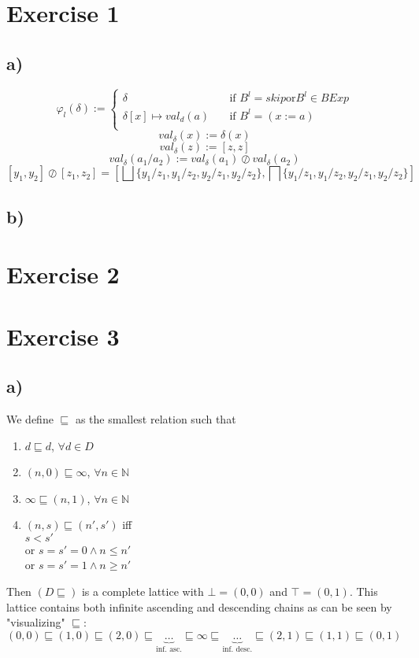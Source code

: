 \documentclass[fleqn,12pt]{article}
\begin{document}
\section*{Exercise 1}
\subsection*{a)}
\[ \varphi_l(\delta) :=
  \begin{cases}
    \delta       & \quad \text{if } B^l = skip \text{or} B^l \in BExp\\
    \delta [x] \mapsto val_d(a) & \quad \text{if } B^l=(x:=a)\\
  \end{cases}
\]
$$val_{\delta}(x):=\delta (x)$$
$$val_{\delta}(z):=[z,z]$$
$$val_{\delta}(a_1/a_2):=val_{\delta}(a_1) \oslash val_{\delta}(a_2)$$
$$[y_1,y_2] \oslash [z_1,z_2]=[\bigsqcup\{y_1/z_1,y_1/z_2,y_2/z_1,y_2/z_2\},\bigsqcap\{y_1/z_1,y_1/z_2,y_2/z_1,y_2/z_2\}]$$
\subsection*{b)}
\section*{Exercise 2}

\section*{Exercise 3}
\subsection*{a)}
We define $\sqsubseteq$ as the smallest relation such that\\
\begin{enumerate}
\item $d \sqsubseteq d$, $\forall d \in D$
\item $(n,0) \sqsubseteq \infty$, $\forall n \in \mathbb{N}$
\item $\infty \sqsubseteq (n,1)$, $\forall n \in \mathbb{N}$
\item $(n,s) \sqsubseteq (n',s')$ iff \\ 
	$s < s'$\\
	or $s=s'=0 \wedge n \leq n'$\\
	or $s=s'=1 \wedge n \geq n'$	
\end{enumerate}
Then $(D\sqsubseteq)$ is a complete lattice with $\bot=(0,0)$ and $\top=(0,1)$.
This lattice contains both infinite ascending and descending chains as can be seen by "visualizing" $\sqsubseteq$:\\
$(0,0)\sqsubseteq(1,0)\sqsubseteq(2,0)\sqsubseteq \underbrace{\dots}_\text{inf. asc.} \sqsubseteq\infty\sqsubseteq \underbrace{\dots}_\text{inf. desc.} \sqsubseteq (2,1) \sqsubseteq (1,1) \sqsubseteq (0,1)$
\newpage
\end{document}
